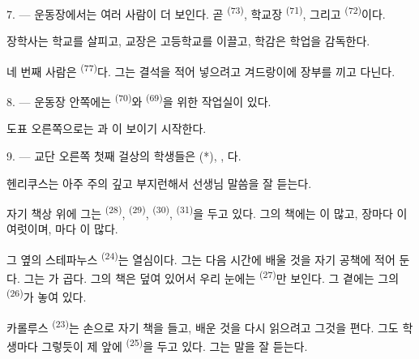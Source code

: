 7. --- 운동장에서는 여러 사람이 더 보인다. 곧  \textsuperscript{(73)},
학교장  \textsuperscript{(71)}, 그리고 
\textsuperscript{(72)}이다.

장학사는 학교를 살피고, 교장은 고등학교를 이끌고, 학감은 학업을 감독한다.

네 번째 사람은  \textsuperscript{(77)}다. 그는 결석을 적어 넣으려고
겨드랑이에 장부를 끼고 다닌다.

8. --- 운동장 안쪽에는  \textsuperscript{(70)}와
 \textsuperscript{(69)}을 위한 작업실이 있다.

도표 오른쪽으로는 과  이 보이기 시작한다.


\VUsaut{2.4mm}

\VUsaut{3.0mm}

9. --- 교단 오른쪽 첫째 걸상의 학생들은  (*), ,
다.

헨리쿠스는 아주 주의 깊고 부지런해서 선생님 말씀을 잘 듣는다.

자기 책상 위에 그는  \textsuperscript{(28)}, 
\textsuperscript{(29)},  \textsuperscript{(30)}, 
\textsuperscript{(31)}을 두고 있다. 그의 책에는 이 많고, 장마다
이 여럿이며, 마다 이 많다.

그 옆의 스테파누스 \textsuperscript{(24)}는 열심이다. 그는 다음 시간에 배울 것을 자기
공책에 적어 둔다. 그는 가 곱다. 그의 책은 덮여 있어서 우리 눈에는
 \textsuperscript{(27)}만 보인다. 그 곁에는 그의 
\textsuperscript{(26)}가 놓여 있다.

카롤루스 \textsuperscript{(23)}는 손으로 자기 책을 들고, 배운 것을 다시 읽으려고
그것을 편다. 그도 학생마다 그렇듯이 제 앞에  \textsuperscript{(25)}을
두고 있다. 그는 말을 잘 듣는다.


